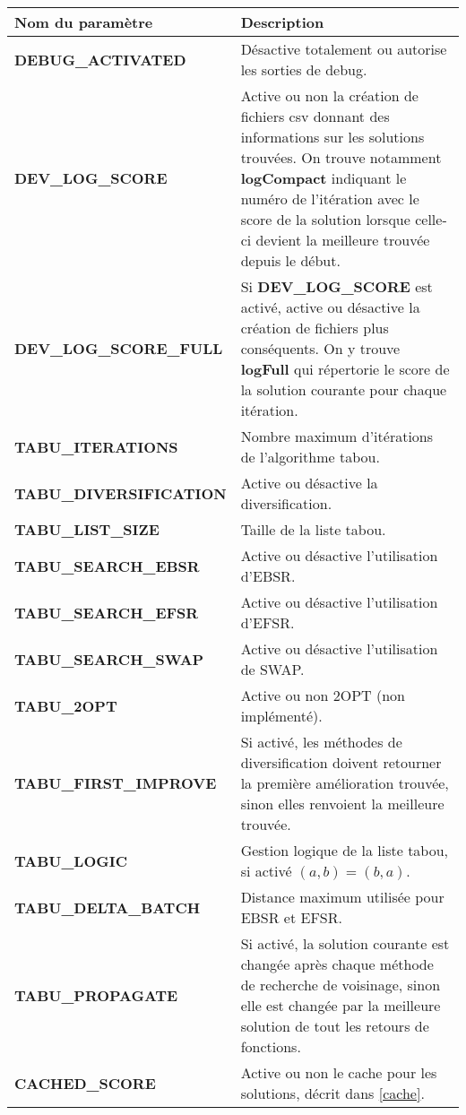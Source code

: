 \documentclass[hideweeklyreports]{polytech/polytech}
\begin{document}
				\begin{tabularx}{\textwidth}{|l|X|}
					\hline
					Nom du paramètre & Description\\\hline\hline
					\textbf{DEBUG\_ACTIVATED} & Désactive totalement ou autorise les sorties de debug.\\\hline
					\textbf{DEV\_LOG\_SCORE} & Active ou non la création de fichiers csv donnant des informations sur les solutions trouvées. On trouve notamment \textbf{logCompact} indiquant le numéro de l'itération avec le score de la solution lorsque celle-ci devient la meilleure trouvée depuis le début.\\\hline
					\textbf{DEV\_LOG\_SCORE\_FULL}&  Si \textbf{DEV\_LOG\_SCORE} est activé, active ou désactive la création de fichiers plus conséquents. On y trouve \textbf{logFull} qui répertorie le score de la solution courante pour chaque itération.\\\hline
					\textbf{TABU\_ITERATIONS} & Nombre maximum d'itérations de l'algorithme tabou.\\\hline
					\textbf{TABU\_DIVERSIFICATION} & Active ou désactive la diversification.\\\hline
					\textbf{TABU\_LIST\_SIZE} & Taille de la liste tabou.\\\hline
					\textbf{TABU\_SEARCH\_EBSR} & Active ou désactive l'utilisation d'EBSR.\\\hline
					\textbf{TABU\_SEARCH\_EFSR} & Active ou désactive l'utilisation d'EFSR.\\\hline
					\textbf{TABU\_SEARCH\_SWAP} & Active ou désactive l'utilisation de SWAP.\\\hline
					\textbf{TABU\_2OPT} & Active ou non 2OPT (non implémenté).\\\hline
					\textbf{TABU\_FIRST\_IMPROVE} & Si activé, les méthodes de diversification doivent retourner la première amélioration trouvée, sinon elles renvoient la meilleure trouvée.\\\hline
					\textbf{TABU\_LOGIC} & Gestion logique de la liste tabou, si activé $\left( a,b\right)=\left( b,a\right)$.\\\hline
					\textbf{TABU\_DELTA\_BATCH} & Distance maximum utilisée pour EBSR et EFSR.\\\hline
					\textbf{TABU\_PROPAGATE} & Si activé, la solution courante est changée après chaque méthode de recherche de voisinage, sinon elle est changée par la meilleure solution de tout les retours de fonctions.\\\hline
					\textbf{CACHED\_SCORE} & Active ou non le cache pour les solutions, décrit dans \autoref{cache}.\\\hline

\end{tabularx}
\end{document}
